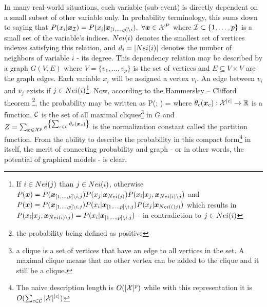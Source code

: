In many real-world situations, each variable (sub-event) is directly dependent on a small subset of other variable only.
In probability terminology, this sums down to saying that $P(x_i |\boldsymbol{x}_{{\cal I}}) = P(x_i|\boldsymbol{x}_{[1,\ldots,p] \setminus i}),\  \forall \boldsymbol{x} \in {\cal X}^{P}$ where ${\cal I} \subset \{1,\ldots,p\}$  is a small set of the variable's indices.
$Nei(i)$ denotes the smallest set of vertices indexes satisfying this relation, and $d_i = |Nei(i)|$ denotes the number of neighbors of variable $i$ - its degree.  
This dependency relation may be described by a graph $G(V,E)$ where $V = \{v_1,\ldots, v_p\}$ is the set of vertices and  $E \subseteq V \times V$ are the graph edges.
Each variable $x_i$ will be assigned a vertex $v_i$. 
An edge between $v_i$ and $v_j$ exists if  $j \in Nei(i)$\footnote{If $i \in Nei(j)$ than $j \in Nei(i)$, otherwise $P(\boldsymbol{x}) = P(\boldsymbol{x}_{[1,\ldots,p]\setminus i,j}) P(x_j|\boldsymbol{x}_{Nei(j)}) P(x_i|x_j,\boldsymbol{x}_{Nei(i)\setminus j})$ and $P(\boldsymbol{x}) = P(\boldsymbol{x}_{[1,\ldots,p]\setminus i,j}) P(x_i|\boldsymbol{x}_{[1,\ldots,p]\setminus i,j}) P(x_j|\boldsymbol{x}_{Nei(()j)})$ which results in $P(x_i|x_j,\boldsymbol{x}_{Nei(i)\setminus j}) =   P(x_i|\boldsymbol{x}_{[1,\ldots,p]\setminus i,j})$ - in contradiction to $j \in Nei(i)$}.
Now, according to the Hammersley – Clifford theorem \cite{hammersley1971markov}\footnote{ the probability being defined as positive}, the probability may be written as
\be
\label{eq:ciluqe_prob}
P(\xx; \thetav) =  
\ee
where $\theta_{c}(\boldsymbol{x}_{c}): {\cal X}^{|c|} \to \mathbb{R}$  is a function, ${\cal C}$ is the set of all maximal cliques\footnote{a clique is a set of vertices that have an edge to all vertices in the set. A maximal clique means that no other vertex can be added to the clique and it still be a clique.} in $G$ and $Z = \sum_{\boldsymbol{x} \in {\cal X}^p} e^{\left\{\sum_{c \in {\cal C}}\theta_{c}(\boldsymbol{x}_{c})\right\}}$ is the normalization constant called the partition function.
From the ability to describe the probability in this compact form\footnote{The naive description length is $O(|{\cal X}|^p)$ while with this representation it is $O(\sum_{c \in {\cal C}} |{\cal X}|^{|c|})$} in itself, the merit of connecting probability and graph - or in other words, the potential of graphical models\cite{koller2009probabilistic} - is clear.


